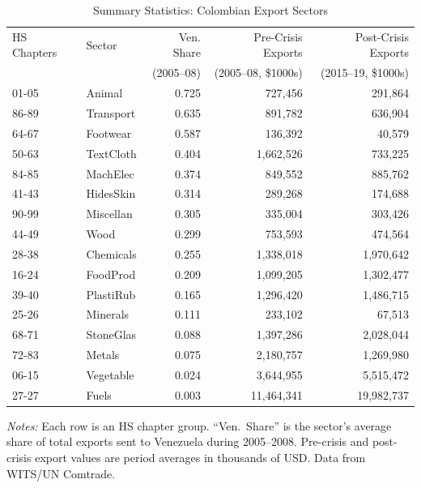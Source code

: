 \begin{table}[!htbp]
\centering
\begin{threeparttable}
\caption{Summary Statistics: Colombian Export Sectors}
\label{tab:summary}
\small
\begin{tabular}{llrrr}
\toprule
HS Chapters & Sector & Ven. Share & Pre-Crisis Exports & Post-Crisis Exports \\
 & & (2005--08) & (2005--08, \$1000s) & (2015--19, \$1000s) \\
\midrule
01-05 & Animal & 0.725 & 727,456 & 291,864 \\
86-89 & Transport & 0.635 & 891,782 & 636,904 \\
64-67 & Footwear & 0.587 & 136,392 & 40,579 \\
50-63 & TextCloth & 0.404 & 1,662,526 & 733,225 \\
84-85 & MachElec & 0.374 & 849,552 & 885,762 \\
41-43 & HidesSkin & 0.314 & 289,268 & 174,688 \\
90-99 & Miscellan & 0.305 & 335,004 & 303,426 \\
44-49 & Wood & 0.299 & 753,593 & 474,564 \\
28-38 & Chemicals & 0.255 & 1,338,018 & 1,970,642 \\
16-24 & FoodProd & 0.209 & 1,099,205 & 1,302,477 \\
39-40 & PlastiRub & 0.165 & 1,296,420 & 1,486,715 \\
25-26 & Minerals & 0.111 & 233,102 & 67,513 \\
68-71 & StoneGlas & 0.088 & 1,397,286 & 2,028,044 \\
72-83 & Metals & 0.075 & 2,180,757 & 1,269,980 \\
06-15 & Vegetable & 0.024 & 3,644,955 & 5,515,472 \\
27-27 & Fuels & 0.003 & 11,464,341 & 19,982,737 \\
\bottomrule
\end{tabular}
\begin{tablenotes}[flushleft]\footnotesize
\item \textit{Notes:} Each row is an HS chapter group. ``Ven.\ Share'' is the sector's average share of total exports sent to Venezuela during 2005--2008. Pre-crisis and post-crisis export values are period averages in thousands of USD. Data from WITS/UN Comtrade.
\end{tablenotes}
\end{threeparttable}
\end{table}
